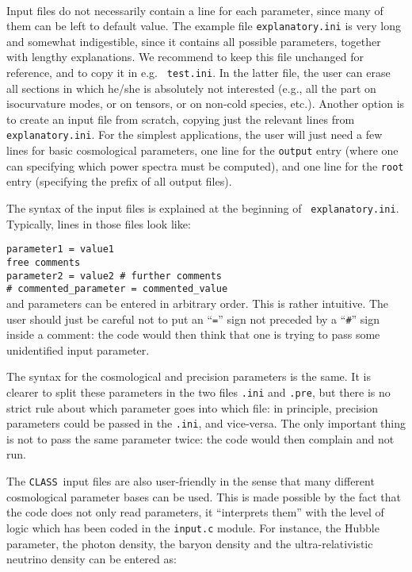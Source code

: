 \documentclass{article}
\newcommand\CLASS{{\tt CLASS}~}
\begin{document}
\\ 

\noindent Input files do not
necessarily contain a line for each parameter, since many of them can
be left to default value. The example file {\tt explanatory.ini} is
very long and somewhat indigestible, since it contains all possible
parameters, together with lengthy explanations. We recommend to keep
this file unchanged for reference, and to copy it in e.g. {\tt
test.ini}. In the latter file, the user can erase all sections in
which he/she is absolutely not interested (e.g., all the part on
isocurvature modes, or on tensors, or on non-cold species,
etc.). Another option is to create an input file from scratch, copying
just the relevant lines from {\tt explanatory.ini}.  For the simplest
applications, the user will just need a few lines for basic
cosmological parameters, one line for the {\tt output} entry (where
one can specifying which power spectra must be computed), and one line
for the {\tt root} entry (specifying the prefix of all output files).

The syntax of the input files is explained at the beginning of {\tt
explanatory.ini}.  Typically, lines in those files look like:

\vspace{0.5cm}

\noindent 
{\tt parameter1 = value1}\\
{\tt free comments}\\
{\tt parameter2 = value2 \# further comments}\\
{\tt \# commented\_parameter = commented\_value}\\

\noindent 
and parameters can be entered in arbitrary order. This is rather
intuitive. The user should just be careful not to put an ``{\tt =}''
sign not preceded by a ``{\tt \#}'' sign inside a comment: the code
would then think that one is trying to pass some unidentified input
parameter.

The syntax for the cosmological and precision parameters is the same.
It is clearer to split these parameters in the two files {\tt .ini}
and {\tt .pre}, but there is no strict rule about which parameter goes
into which file: in principle, precision parameters could be passed in
the {\tt .ini}, and vice-versa. The only important thing is not to pass
the same parameter twice: the code would then complain and not run.

The \CLASS input files are also user-friendly in the sense that many
different cosmological parameter bases can be used. This is made
possible by the fact that the code does not only read parameters, it
``interprets them'' with the level of logic which has been coded in
the {\tt input.c} module. For instance, the Hubble parameter, the photon
density, the baryon density and the ultra-relativistic neutrino density can be
entered as:
\end{document}
